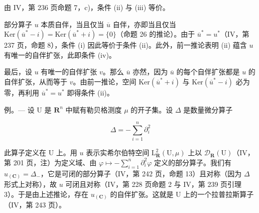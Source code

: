 由 IV，第 236 页命题 7，c)，条件 (ii) 与 (iii) 等价。

部分算子 \(u\) 本质自伴，当且仅当 \(\overline{u}\) 自伴，亦即当且仅当 \(\text{Ker}(\overline{u}^* - i) = \text{Ker}(\overline{u}^* + i) = \{0\}\)（命题 26 的推论）。由于 \(\overline{u}^* = u^*\)（IV，第 237 页，命题 8），条件 (i) 因此等价于条件 (ii)。此外，前一推论表明 (ii) 蕴含 \(u\) 有唯一的自伴扩张，此即条件 (iv)。

最后，设 \(u\) 有唯一的自伴扩张 \(v\)。那么 \(\overline{u}\) 亦然，因为 \(\overline{u}\) 的每个自伴扩张都是 \(u\) 的自伴扩张，从而等于 \(v\)。由前一推论，空间 \(\mathrm{Ker}(\overline{u}^{*} + i)\) 与 \(\mathrm{Ker}(\overline{u}^{*} - i)\) 必为零，再利用 \(\overline{u}^{*} = u^{*}\) 即得条件 (ii)。

例。--- 设 U 是 \(\mathbf{R}^{n}\) 中赋有勒贝格测度 \(\mu\) 的开子集。设 \(\Delta\) 是数量微分算子

\[
\Delta = - \sum_ {i = 1} ^ {n} \partial_ {i} ^ {2}
\]

此算子定义在 U 上。用 \(u\) 表示实希尔伯特空间 \(\mathrm{L}_{\mathbf{R}}^{2}(\mathrm{U},\mu)\) 上以 \(\mathcal{D}_{\mathbf{R}}(\mathrm{U})\)（IV，第 201 页，注）为定义域、由 \(\varphi \mapsto -\sum_{i=1}^{n}\partial_{i}^{2}\varphi\) 定义的部分算子。我们有 \(u_{(\mathbf{C})} = \Delta_{-}\)，它是可闭的部分算子（IV，第 242 页，命题 13）且对称（因为 \(\Delta\) 形式上对称），故 \(u\) 可闭且对称（IV，第 228 页命题 2 与 IV，第 239 页引理 3）。于是由上述推论，存在 \(u_{(\mathbf{C})}\) 的自伴扩张。这就是 U 上的一个拉普拉斯算子（IV，第 243 页）。

